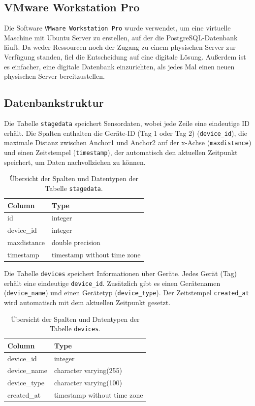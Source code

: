 \subsection{VMware Workstation Pro}
Die Software \texttt{VMware Workstation Pro} wurde verwendet, um eine virtuelle Maschine mit Ubuntu Server zu erstellen, auf der die PostgreSQL-Datenbank läuft. Da weder Ressourcen noch der Zugang zu einem physischen Server zur Verfügung standen, fiel die Entscheidung auf eine digitale Lösung. Außerdem ist es einfacher, eine digitale Datenbank einzurichten, als jedes Mal einen neuen physischen Server bereitzustellen.

\subsection{Datenbankstruktur}
Die Tabelle \texttt{stagedata} speichert Sensordaten, wobei jede Zeile eine eindeutige ID erhält. Die Spalten enthalten die Geräte-ID (Tag 1 oder Tag 2) (\texttt{device\_id}), die maximale Distanz zwischen Anchor1 und Anchor2 auf der x-Achse (\texttt{maxdistance}) und einen Zeitstempel (\texttt{timestamp}), der automatisch den aktuellen Zeitpunkt speichert, um Daten nachvollziehen zu können.
\begin{table}[h]
	\centering
	\begin{tabular}{|l|l|}
		\hline
		\textbf{Column} & \textbf{Type} \\
		\hline
		id & integer \\
		\hline
		device\_id & integer \\
		\hline
		maxdistance & double precision \\
		\hline
		timestamp & timestamp without time zone \\
		\hline
	\end{tabular}
	\caption{Übersicht der Spalten und Datentypen der Tabelle \texttt{stagedata}.}
	\label{tab:stagedata}
\end{table}

\newpage
Die Tabelle \texttt{devices} speichert Informationen über Geräte. Jedes Gerät (Tag) erhält eine eindeutige \texttt{device\_id}. Zusätzlich gibt es einen Gerätenamen (\texttt{device\_name}) und einen Gerätetyp (\texttt{device\_type}). Der Zeitstempel \texttt{created\_at} wird automatisch mit dem aktuellen Zeitpunkt gesetzt.
\begin{table}[h]
	\centering
	\begin{tabular}{|l|l|}
		\hline
		\textbf{Column} & \textbf{Type} \\
		\hline
		device\_id & integer \\
		\hline
		device\_name & character varying(255) \\
		\hline
		device\_type & character varying(100) \\
		\hline
		created\_at & timestamp without time zone \\
		\hline
	\end{tabular}
	\caption{Übersicht der Spalten und Datentypen der Tabelle \texttt{devices}.}
	\label{tab:devices}
\end{table}

